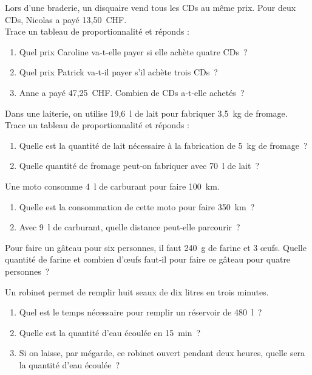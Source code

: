 
\begin{exercice}[À la braderie]
Lors d'une braderie, un disquaire vend tous les CDs au même prix. Pour deux CDs, Nicolas a payé 13,50 CHF. \\[0.5em]
Trace un tableau de proportionnalité et réponds :
\begin{enumerate}
 \item Quel prix Caroline va‑t‑elle payer si elle achète quatre CDs ?
 \item Quel prix Patrick va‑t‑il payer s'il achète trois CDs ?
 \item Anne a payé 47,25 CHF. Combien de CDs a‑t‑elle achetés ?
 \end{enumerate}
\end{exercice}


\begin{exercice}[À la laiterie]
Dans une laiterie, on utilise 19,6 l de lait pour fabriquer 3,5 kg de fromage. \\[0.5em]
Trace un tableau de proportionnalité et réponds :
\begin{enumerate}
 \item Quelle est la quantité de lait nécessaire à la fabrication de 5 kg de fromage ?
 \item Quelle quantité de fromage peut‑on fabriquer avec 70 l de lait ?
 \end{enumerate}
\end{exercice}


\begin{exercice}
Une moto consomme 4 l de carburant pour faire 100 km.
\begin{enumerate}
 \item Quelle est la consommation de cette moto pour faire 350 km ?
 \item Avec 9 l de carburant, quelle distance peut‑elle parcourir ?
 \end{enumerate}
\end{exercice}


\begin{exercice}[Recette]
Pour faire un gâteau pour six personnes, il faut 240 g de farine et 3 œufs. Quelle quantité de farine et combien d'œufs faut‑il pour faire ce gâteau pour quatre personnes ?
\end{exercice}


\begin{exercice}
Un robinet permet de remplir huit seaux de dix litres en trois minutes.
\begin{enumerate}
 \item Quel est le temps nécessaire pour remplir un réservoir de 480 l ?
 \item Quelle est la quantité d'eau écoulée en 15 min ?
 \item Si on laisse, par mégarde, ce robinet ouvert pendant deux heures, quelle sera la quantité d'eau écoulée ?
 \end{enumerate}
\end{exercice}


